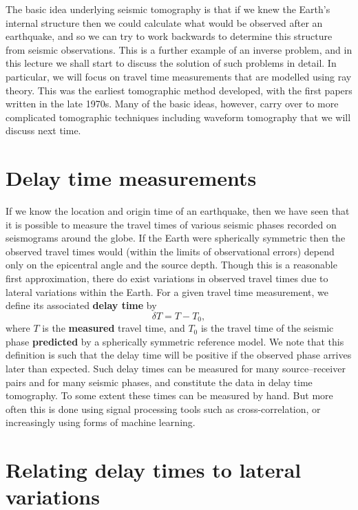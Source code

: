 The basic idea underlying seismic tomography is that if we knew the Earth's internal structure then we could calculate what
would be observed after an earthquake, and so we can try to work backwards to determine this structure from seismic observations.
This is a further example of an inverse problem, and in this lecture we shall start to discuss the solution of such problems in 
detail. In particular, we will focus on travel time measurements that are modelled using ray theory. This was the earliest 
tomographic method developed, with the first papers written in the late 1970s. Many of the basic ideas, however, carry over to 
more complicated tomographic techniques including waveform tomography that we will discuss next time.

\section*{Delay time measurements}

If we know the location and origin time of an earthquake, then we have seen that it is possible to measure the travel times of 
various seismic phases recorded on seismograms around the globe. If the Earth were spherically symmetric then the observed travel 
times would (within the limits of observational errors) depend only on the epicentral angle and the source depth. Though this is 
a reasonable first approximation, there do exist variations in observed travel times due to lateral variations within the Earth. 
For a given travel time measurement, we define its associated \textbf{delay time} by
\begin{equation}
    \delta T = T - T_{0},
    \label{eq:1}
\end{equation}
where $T$ is the \textbf{measured} travel time, and $T_{0}$ is the travel time of the seismic phase \textbf{predicted}
by a spherically symmetric reference model. We note that this definition is such that the delay time will be positive if the observed 
phase arrives later than expected. Such delay times can be measured for many source--receiver pairs and for many seismic 
phases, and constitute the data in delay time tomography. To some extent these times can be measured by hand. But more 
often this is done using signal processing tools such as cross-correlation, or increasingly using forms of machine 
learning.

\section*{Relating delay times to lateral variations}

